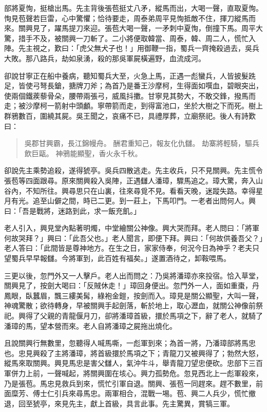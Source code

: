 部將夏恂，挺槍出馬。先主背後張苞挺丈八矛，縱馬而出，大喝一聲，直取夏恂。恂見苞聲若巨雷，心中驚懼；恰待要走，周泰弟周平見恂抵敵不住，揮刀縱馬而來。關興見了，躍馬提刀來迎。張苞大喝一聲，一矛刺中夏恂，倒撞下馬。周平大驚，措手不及，被關興一刀斬了。二小將便取韓當、周泰，韓、周二人，慌忙入陣。先主視之，歎曰：「虎父無犬子也！」用御鞭一指，蜀兵一齊掩殺過去，吳兵大敗。那八路兵，劫如泉湧，殺的那吳軍屍橫遍野，血流成河。

卻說甘寧正在船中養病，聽知蜀兵大至，火急上馬，正遇一彪蠻兵，人皆披髮跣足，皆使弓弩長鎗，搪牌刀斧；為首乃是番王沙摩柯，生得面如噀血，碧眼突出，使兩個鐵蒺藜骨朵，腰帶兩張弓，威風抖擻。甘寧見其勢大，不敢交鋒，撥馬而走；被沙摩柯一箭射中頭顱。寧帶箭而走，到得富池口，坐於大樹之下而死。樹上群鴉數百，圍繞其屍。吳王聞之，哀痛不已，具禮厚葬，立廟祭祀。後人有詩歎曰：

\begin{quote}
吳郡甘興霸，長江錦幔舟。
酬君重知己，報友化仇讎。
劫寨將輕騎，驅兵飲巨甌。
神鴉能顯聖，香火永千秋。
\end{quote}

卻說先主乘勢追殺，遂得猇亭。吳兵四散逃走。先主收兵，只不見關興。先主慌令張苞等四面跟尋。原來關興殺入吳陣，正遇讎人潘璋，驟馬追之。璋大驚，奔入山谷內，不知所往。興尋思只在山裏，往來尋覓不見。看看天晚，迷蹤失路。幸得星月有光。追至山僻之間，時已二更。到一莊上，下馬叩門。一老者出問何人。興曰：「吾是戰將，迷路到此，求一飯充飢。」

老人引入，興見堂內點著明燭，中堂繪關公神像。興大哭而拜。老人問曰：「將軍何故哭拜？」興曰：「此吾父也。」老人聞言，即便下拜。興曰：「何故供養吾父？」老人答曰：「此間皆是尊神地方。在生之日，家家侍奉，何況今日為神乎？老夫只望蜀兵早早報讎。今將軍到，此百姓有福矣。」遂置酒待之，卸鞍喂馬。

三更以後，忽門外又一人擊戶。老人出而問之：乃吳將潘璋亦來投宿。恰入草堂，關興見了，按劍大喝曰：「反賊休走！」璋回身便出。忽門外一人，面如重棗，丹鳳眼，臥蠶眉，飄三縷美髯，綠袍金鎧，按劍而入。璋見是關公顯聖，大叫一聲，神魂驚散；欲待轉身，早被關興手起劍落，斬於地上，取心瀝血，就關公神像前祭祀。興得了父親的青龍偃月刀，卻將潘璋首級，擐於馬項之下，辭了老人，就騎了潘璋的馬，望本營而來。老人自將潘璋之屍拖出燒化。

且說關興行無數里，忽聽得人喊馬嘶，一彪軍到來；為首一將，乃潘璋部將馬忠也。忠見興殺了主將潘璋，將首級擐於馬項之下；青龍刀又被興得了；勃然大怒，縱馬來取關興。興見馬忠是害父讎人，氣沖牛斗，舉青龍刀望忠便砍。忠部下三百軍併力上前，一聲喊起，將關興圍在垓心。興力孤勢危。忽見西北上一彪軍殺來，乃是張苞。馬忠見救兵到來，慌忙引軍自退。關興、張苞一同趕來。趕不數里，前面糜芳、傅士仁引兵來尋馬忠。兩軍相合，混戰一埸。苞、興二人兵少，慌忙撤退，回至猇亭，來見先主，獻上首級，具言此事。先主驚異，賞犒三軍。

